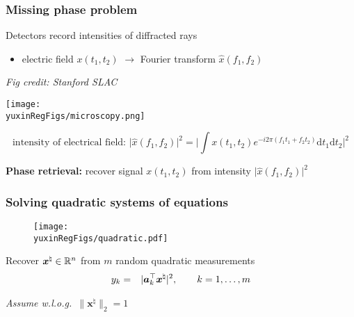 \documentclass[compress,
mathserif,wide,%
]{beamer}
\let\hat\widehat
\newcommand{\yuxinRegFigs}{figure}
\begin{document}
\begin{frame}
  \frametitle{Missing phase problem}

Detectors record \alert{intensities} of diffracted rays

  \begin{itemize}
	\item electric field $x(t_1, t_2)$  $\longrightarrow$ Fourier transform $\hat{x}(f_{1},f_{2})$
  \end{itemize}
  \vfill
{\hfill\em\footnotesize Fig credit: Stanford SLAC}
\begin{center}
\texttt{[image: \\yuxinRegFigs/microscopy.png]} 
\end{center}

{\small
\[
\text{intensity of electrical field: }\big| \hat{x}(f_{1},f_{2}) \big|^2 = \Big|{ \int}x(t_{1},t_{2}) e^{-i2\pi(f_{1}t_{1}+f_{2}t_{2})}\mathrm{d}t_{1}\mathrm{d}t_{2}\Big|^{2}
\]
}
\pause
\vspace{-1em}



{

\begin{varblock}[\textwidth]{}
\begin{center}
   {\bf Phase retrieval:}  recover signal $x(t_{1},t_{2})$ from intensity $| \hat{x}(f_{1},f_{2}) \big|^2$
\end{center}
\end{varblock}
}
	
\end{frame}








\begin{frame}
\frametitle{Solving quadratic systems of equations}

\vspace{-1em}
\begin{figure}
	\centering
	\texttt{[image: \\yuxinRegFigs/quadratic.pdf]}
\end{figure}

Recover $\bm{x}^{\natural} \in \mathbb{R}^n$ from $m$ random quadratic measurements
\begin{eqnarray*}
y_k &= &|\bm{a}_k^\top\bm{x}^{\natural}|^2, \qquad k = 1, \ldots, m  
\end{eqnarray*}

\hfill \textit{Assume w.l.o.g.~}$\|\bm{x}^{\natural}\|_2=1$


\end{frame}
\end{document}
